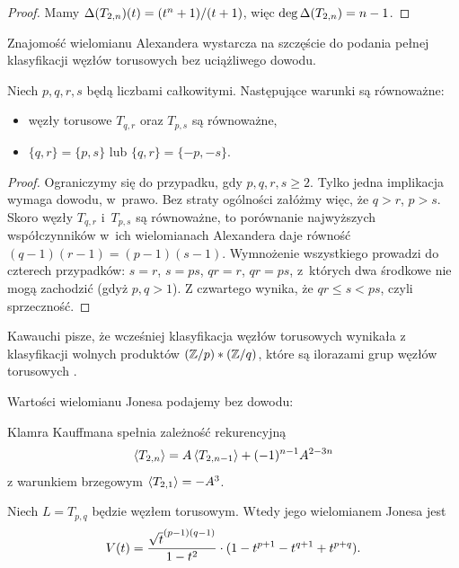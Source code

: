 \begin{proof}
    Mamy $\Delta(T_{2,n})(t) = (t^n+1) / (t+1)$, więc $\deg \Delta (T_{2,n}) = n - 1$.
\end{proof}

Znajomość wielomianu Alexandera wystarcza na szczęście do podania pełnej klasyfikacji węzłów torusowych bez uciążliwego dowodu.

\begin{proposition}
    Niech $p, q, r, s$ będą liczbami całkowitymi.
    Następujące warunki są równoważne:
    \begin{itemize}
        \item węzły torusowe $T_{q, r}$ oraz $T_{p, s}$ są równoważne,
        \item $\{q, r\} = \{p, s\}$ lub $\{q, r\} = \{-p, -s\}$.
    \end{itemize}
\end{proposition}

\begin{proof}
    Ograniczymy się do przypadku, gdy $p, q, r, s \ge 2$.
    Tylko jedna implikacja wymaga dowodu, w~prawo.
    Bez straty ogólności załóżmy więc, że $q > r$, $p > s$.
    Skoro węzły $T_{q, r}$ i~$T_{p,s}$ są równoważne, to porównanie najwyższych współczynników w~ich wielomianach Alexandera daje równość $(q-1)(r-1) = (p-1)(s-1)$.
    Wymnożenie wszystkiego prowadzi do czterech przypadków: $s = r$, $s = ps$, $qr = r$, $qr = ps$, z~których dwa środkowe nie mogą zachodzić (gdyż $p, q > 1$).
    Z czwartego wynika, że $qr \le s < ps$, czyli sprzeczność.
\end{proof}

Kawauchi pisze, że wcześniej klasyfikacja węzłów torusowych wynikała z klasyfikacji wolnych produktów $(\mathbb Z/p) * (\mathbb Z/q)$, które są ilorazami grup węzłów torusowych \cite{schreier24}.

Wartości wielomianu Jonesa podajemy bez dowodu:

\begin{proposition}
%
    Klamra Kauffmana spełnia zależność rekurencyjną
    \begin{equation}
        \left\langle{T_{2, n}}\right\rangle = A \left\langle{T_{2,n-1}}\right\rangle + (-1)^{n-1} A^{2-3n}
    \end{equation}
    z warunkiem brzegowym $\left\langle{T_{2,1}}\right\rangle = -A^3$.
\end{proposition}

\begin{proposition}
%
    Niech $L = T_{p, q}$ będzie węzłem torusowym.
    Wtedy jego wielomianem Jonesa jest
    \begin{equation}
        V(t) = \frac {{\sqrt t}^{(p-1)(q-1)}}{1-t^2} \cdot (1 - t^{p+1} - t^{q+1} + t^{p+q}).
    \end{equation}
\end{proposition}

